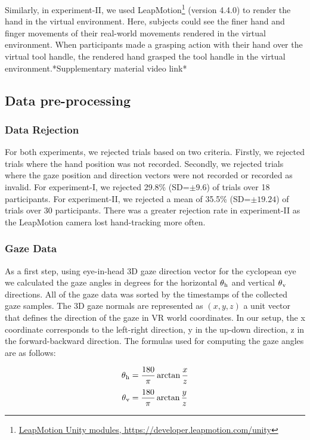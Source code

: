 Similarly, in experiment-II, we used LeapMotion\footnote{\href{https://developer.leapmotion.com/unity}{LeapMotion Unity modules, https://developer.leapmotion.com/unity}} (version 4.4.0)  to render the hand in the virtual environment. Here, subjects could see the finer hand and finger movements of their real-world movements rendered in the virtual environment. When participants made a grasping action with their hand over the virtual tool handle, the rendered hand grasped the tool handle in the virtual environment.*Supplementary material video link*

\subsection{Data pre-processing}

\subsubsection{Data Rejection}

For both experiments, we rejected trials based on two criteria. Firstly, we rejected trials where the hand position was not recorded. Secondly, we rejected trials where the gaze position and direction vectors were not recorded or recorded as invalid. For experiment-I, we rejected 29.8\% (SD=$\pm 9.6$) of trials over 18 participants. For experiment-II, we rejected a mean of 35.5\% (SD=$\pm 19.24$) of trials over 30 participants. There was a greater rejection rate in experiment-II as the LeapMotion camera lost hand-tracking more often.

\subsubsection{Gaze Data}

As a first step, using eye-in-head 3D gaze direction vector for the cyclopean eye we calculated the gaze angles in degrees for the horizontal $\theta\textsubscript{h}$ and vertical $\theta\textsubscript{v}$ directions. All of the gaze data was sorted by the timestamps of the collected gaze samples. The 3D gaze normals are represented as $(x, y, z)$ a unit vector that defines the direction of the gaze in VR world coordinates. In our setup, the x coordinate corresponds to the left-right direction, y in the up-down direction, z in the forward-backward direction. The formulas used for computing the gaze angles are as follows:

 \begin{equation*}\label{eq:h_angle}
     \theta\textsubscript{h} = \frac{180}{\pi} \arctan{\frac{x}{z}}
 \end{equation*}   
  \begin{equation*}\label{eq:v_angle}
     \theta\textsubscript{v} = \frac{180}{\pi} \arctan{\frac{y}{z}} 
 \end{equation*}   
 
